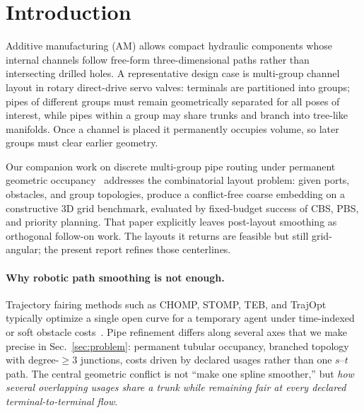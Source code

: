 
\section{Introduction}
\label{sec:intro}

Additive manufacturing (AM) allows compact hydraulic components whose internal
channels follow free-form three-dimensional paths rather than intersecting
drilled holes.
A representative design case is multi-group channel layout in rotary
direct-drive servo valves: terminals are partitioned into groups; pipes of
different groups must remain geometrically separated for all poses of interest,
while pipes within a group may share trunks and branch into tree-like
manifolds.
Once a channel is placed it permanently occupies volume, so later groups must
clear earlier geometry.

Our companion work on discrete multi-group pipe routing under permanent
geometric occupancy~\cite{deng2025pipe_design} addresses the combinatorial
layout problem: given ports, obstacles, and group topologies, produce a
conflict-free coarse embedding on a constructive 3D grid benchmark, evaluated
by fixed-budget success of CBS, PBS, and priority planning.
That paper explicitly leaves post-layout smoothing as orthogonal follow-on
work.
The layouts it returns are feasible but still grid-angular; the present report
refines those centerlines.

\paragraph{Why robotic path smoothing is not enough.}
Trajectory fairing methods such as CHOMP, STOMP, TEB, and TrajOpt typically
optimize a single open curve for a temporary agent under time-indexed or soft
obstacle costs~\cite{zucker2013chomp,kalakrishnan2011stomp,roesmann2013teb,schulman2014trajopt}.
Pipe refinement differs along several axes that we make precise in
Sec.~\ref{sec:problem}: permanent tubular occupancy, branched topology with
degree-$\ge 3$ junctions, costs driven by declared usages rather than one
$s$--$t$ path.
The central geometric conflict is not ``make one spline smoother,'' but
\emph{how several overlapping usages share a trunk while remaining fair at every
declared terminal-to-terminal flow}.

